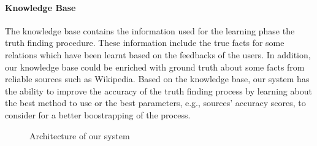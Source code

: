 \paragraph*{Knowledge Base}The knowledge base contains the information used for the learning
phase the truth finding procedure. These information include the true facts for some relations
which have been learnt based on the feedbacks of the users. In addition, our knowledge base could
be enriched with ground truth about some facts from reliable sources such as Wikipedia. Based on 
the knowledge base, our system has the ability to improve the accuracy of the truth finding process
by learning about the best method to use or the best parameters, e.g., sources' accuracy scores, to 
consider for a better boostrapping of the process.

\begin{figure}[ht]
\caption{Architecture of our system}\label{system_architecture}
\end{figure}
